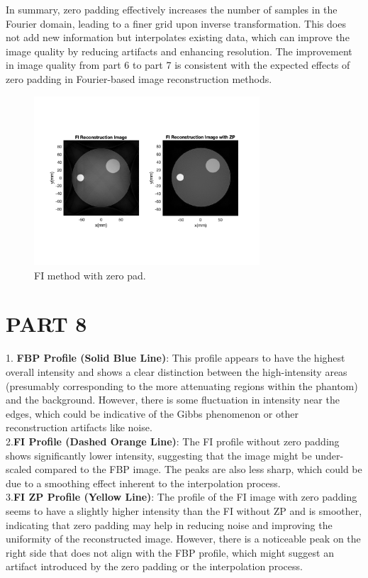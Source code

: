 \documentclass{report}
\begin{document}
In summary, zero padding effectively increases the number of samples in the Fourier domain, 
leading to a finer grid upon inverse transformation. This does not add new information 
but interpolates existing data, which can improve the image quality by reducing 
artifacts and enhancing resolution. The improvement in image quality from part 6
to part 7 is consistent with the expected effects of zero padding in Fourier-based
image reconstruction methods.
\begin{figure}[hb]
    \centering
    \includegraphics[width=0.75\textwidth]{7.png}
    \caption{FI method with zero pad.}
\end{figure}
\newpage 
\section[short]{PART 8}
1. \textbf{FBP Profile (Solid Blue Line)}: This profile appears to have the highest overall 
intensity and shows a clear distinction between the high-intensity areas (presumably
corresponding to the more attenuating regions within the phantom) and the background. 
However, there is some fluctuation in intensity near the edges, which could be 
indicative of the Gibbs phenomenon or other reconstruction artifacts like noise.\\

2.\textbf{FI Profile (Dashed Orange Line)}: The FI profile without zero padding shows significantly
lower intensity, suggesting that the image might be under-scaled compared to the FBP image. 
The peaks are also less sharp, which could be due to a smoothing effect inherent
to the interpolation process.\\

3.\textbf{FI ZP Profile (Yellow Line)}: The profile of the FI image with zero padding seems 
to have a slightly higher intensity than the FI without ZP and is smoother, indicating 
that zero padding may help in reducing noise and improving the uniformity of the 
reconstructed image. However, there is a noticeable peak on the right side that 
does not align with the FBP profile, which might suggest an artifact introduced 
by the zero padding or the interpolation process.
\end{document}
